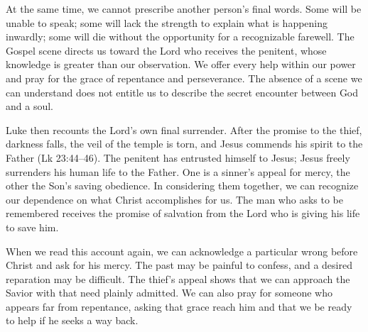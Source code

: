 At the same time, we cannot prescribe another person's final words. Some will be unable to speak; some will lack the strength to explain what is happening inwardly; some will die without the opportunity for a recognizable farewell. The Gospel scene directs us toward the Lord who receives the penitent, whose knowledge is greater than our observation. We offer every help within our power and pray for the grace of repentance and perseverance. The absence of a scene we can understand does not entitle us to describe the secret encounter between God and a soul.

Luke then recounts the Lord's own final surrender. After the promise to the thief, darkness falls, the veil of the temple is torn, and Jesus commends his spirit to the Father (Lk 23:44--46). The penitent has entrusted himself to Jesus; Jesus freely surrenders his human life to the Father. One is a sinner's appeal for mercy, the other the Son's saving obedience. In considering them together, we can recognize our dependence on what Christ accomplishes for us. The man who asks to be remembered receives the promise of salvation from the Lord who is giving his life to save him.

When we read this account again, we can acknowledge a particular wrong before Christ and ask for his mercy. The past may be painful to confess, and a desired reparation may be difficult. The thief's appeal shows that we can approach the Savior with that need plainly admitted. We can also pray for someone who appears far from repentance, asking that grace reach him and that we be ready to help if he seeks a way back.

